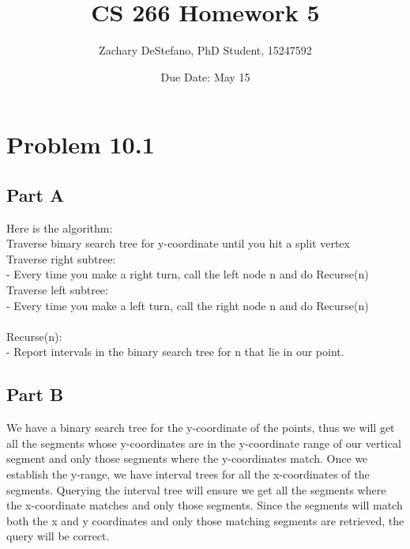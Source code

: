 \documentclass[11pt,psfig]{article}
\begin{document}
\setlength{\parskip}{1.2ex plus0.3ex minus 0.3ex}


\thispagestyle{empty} \pagestyle{myheadings} 



\title{CS 266 Homework 5}
\author{Zachary DeStefano, PhD Student, 15247592}
\date{Due Date: May 15}

\maketitle

\vfill\eject

\section*{Problem 10.1}

\subsection*{Part A}

Here is the algorithm:\\
Traverse binary search tree for y-coordinate until you hit a split vertex\\
Traverse right subtree:\\
- Every time you make a right turn, call the left node n and do Recurse(n)\\
Traverse left subtree:\\
- Every time you make a left turn, call the right node n and do Recurse(n)\\
\\
Recurse(n):\\
- Report intervals in the binary search tree for n that lie in our point.\\

\subsection*{Part B}

We have a binary search tree for the y-coordinate of the points, thus we will get all the segments whose y-coordinates are in the y-coordinate range of our vertical segment and only those segments where the y-coordinates match. Once we establish the y-range, we have interval trees for all the x-coordinates of the segments. Querying the interval tree will ensure we get all the segments where the x-coordinate matches and only those segments. Since the segments will match both the x and y coordinates and only those matching segments are retrieved, the query will be correct. 
\end{document}
